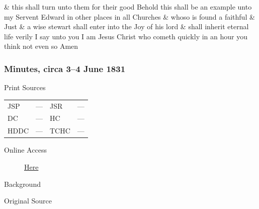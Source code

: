 \& this shall turn unto them for their good Behold this shall be an example unto my Servent Edward in other places in all Churches \& whoso is found a faithful \& Just \& a wise stewart shall enter into the Joy of his lord \& shall inherit eternal life verily I say unto you I am Jesus Christ who cometh quickly in an hour you think not even so Amen
				
		\subsubsection{Minutes, circa 3--4 June 1831}
			\label{EMS-1831-JS-CIR-3-4-JUN-1831}
		
			\begin{description}
				\item[Print Sources]
			\end{description}

				\begin{tabular}{p{0.5in}p{1in}p{0.5in}p{1in}}
				JSP	 	& ---		& JSR 		& --- \\
				DC	 	& --- 		& HC 		& --- \\
				HDDC 	& ---		& TCHC 		& --- \\
				\end{tabular}
			
			\begin{description}
				\item[Online Access] \href{https://www.josephsmithpapers.org/paper-summary/minutes-circa-3-4-june-1831/1}{Here}
			\end{description}
			
			\begin{description}
				\item[Background]
			\end{description}
			
			
			\begin{description}
				\item[Original Source]
			\end{description}
			
